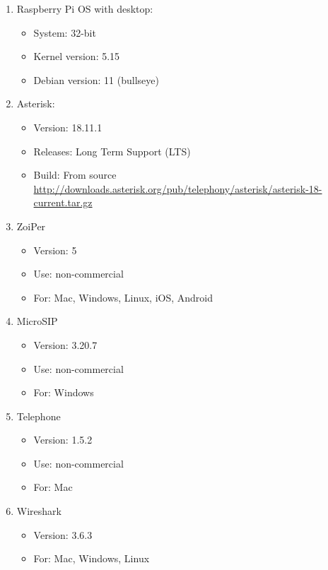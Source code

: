 		\begin{enumerate}
			\item Raspberry Pi OS with desktop: 
				\begin{itemize}
					\item System: 32-bit
					\item Kernel version: 5.15
					\item  Debian version: 11 (bullseye)
				\end{itemize}
			\item Asterisk:
				\begin{itemize}
					\item Version: 18.11.1
					\item Releases: Long Term Support (LTS)
					\item Build: From source \url{http://downloads.asterisk.org/pub/telephony/asterisk/asterisk-18-current.tar.gz}
				\end{itemize}
			\item ZoiPer
				\begin{itemize}
					\item Version: 5
					\item Use: non-commercial 
					\item For: Mac, Windows, Linux, iOS, Android
				\end{itemize}
			\item MicroSIP
				\begin{itemize}
					\item Version: 3.20.7
					\item Use: non-commercial 
					\item For: Windows
				\end{itemize}
			\item Telephone
				\begin{itemize}
					\item Version: 1.5.2
					\item Use: non-commercial 
					\item For: Mac
				\end{itemize}
			\item Wireshark
				\begin{itemize}
					\item Version: 3.6.3
					\item For: Mac, Windows, Linux
				\end{itemize}
		\end{enumerate}
	